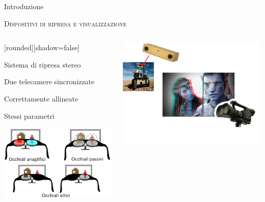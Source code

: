 \documentclass{beamer}
\begin{document}
\begin{section}{Introduzione}

\begin{frame}[t]{\textsc{Dispositivi di ripresa e visualizzazione}}
\vspace{-0.3em}
\begin{columns}
\begin{column}{5cm}
\begin{center}
[rounded][shadow=false]
\begin{block}{Sistema di ripresa stereo}
		\begin{itemize}
			\item  \small{Due telecamere sincronizzate
			\item Correttamente allineate
			\item Stessi parametri}
		\end{itemize}	
	\end{block}
\end{center}
\centering
\includegraphics[width=1\linewidth]{./img/display.png}
\end{column}
\begin{column}{5cm}
\centering
\vspace{0.7em}
\includegraphics[width=1\linewidth]{./img/camere.png}

\end{column}
\end{columns}
\end{frame}
\end{section}
\end{document}
